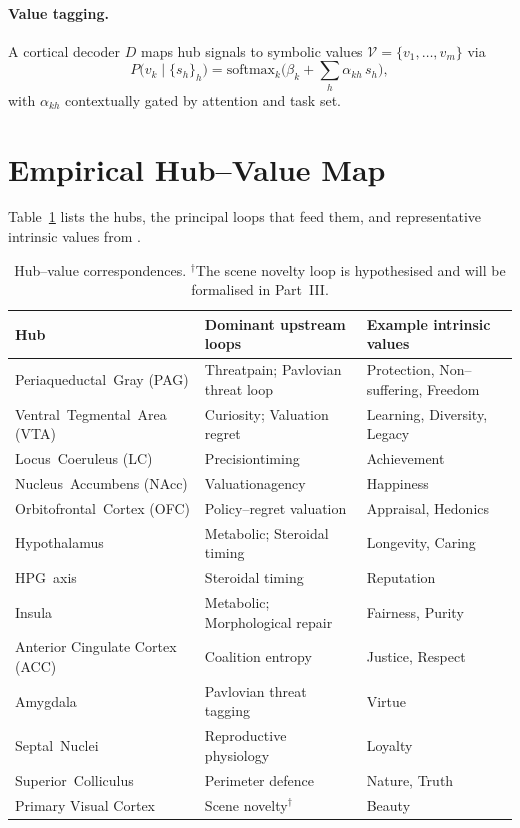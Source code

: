 \documentclass[11pt]{article}
\begin{document}
\paragraph{Value tagging.} A cortical decoder $D$ maps hub signals to symbolic values $\mathcal{V}=\{v_1,\dots,v_m\}$ via
\begin{equation}
 P\bigl(v_k\mid\{s_h\}_h\bigr)=\mathrm{softmax}_k\bigl(\beta_k+\sum_h \alpha_{kh}\,s_h\bigr),
\end{equation}
with $\alpha_{kh}$ contextually gated by attention and task set.

\section{Empirical Hub--Value Map}
Table~\ref{tab:hv} lists the hubs, the principal loops that feed them, and representative intrinsic values from \citet{zarncke2025stratification}.

\begin{table}[h]
\centering
\footnotesize
\begin{tabular}{@{}lll@{}}
\toprule
Hub & Dominant upstream loops & Example intrinsic values \\
\midrule
Periaqueductal~Gray (PAG) & Threat\/pain; Pavlovian threat loop & Protection, Non--suffering, Freedom \\
Ventral~Tegmental~Area (VTA) & Curiosity; Valuation regret & Learning, Diversity, Legacy \\
Locus~Coeruleus (LC) & Precision\/timing & Achievement \\
Nucleus~Accumbens (NAcc) & Valuation\/agency & Happiness \\
Orbitofrontal~Cortex (OFC) & Policy--regret valuation & Appraisal, Hedonics \\
Hypothalamus & Metabolic; Steroidal timing & Longevity, Caring \\
HPG~axis & Steroidal timing & Reputation \\
Insula & Metabolic; Morphological repair & Fairness, Purity \\
Anterior Cingulate Cortex (ACC) & Coalition entropy & Justice, Respect \\
Amygdala & Pavlovian threat tagging & Virtue \\
Septal~Nuclei & Reproductive physiology & Loyalty \\
Superior~Colliculus & Perimeter defence & Nature, Truth \\
Primary Visual Cortex & Scene novelty$^{\dagger}$ & Beauty \\
\bottomrule
\end{tabular}
\caption{Hub--value correspondences. $^{\dagger}$The scene novelty loop is hypothesised and will be formalised in Part~III.}
\label{tab:hv}
\end{table}
\end{document}
